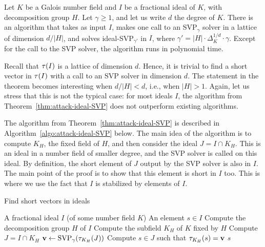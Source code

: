 \begin{theorem}
\label{thm:attack-ideal-SVP}
Let $K$ be a Galois number field and $I$ be a fractional ideal of $K$, with decomposition group $H$. Let $\gamma \geq 1$, and let us write $d$ the degree of $K$. There is an algorithm that takes as input $I$, makes one call to an SVP$_\gamma$ solver in a lattice of dimension $d/|H|$, and solves ideal-SVP$_{\gamma'}$ in $I$, where $\gamma' = |H| \cdot \Delta_K^{1/d} \cdot \gamma$.
Except for the call to the SVP solver, the algorithm runs in polynomial time.
\end{theorem}

Recall that $\tau(I)$ is a lattice of dimension $d$. Hence, it is trivial to find a short vector in $\tau(I)$ with a call to an SVP solver in dimension $d$. The statement in the theorem becomes interesting when $d/|H| < d$, i.e., when $|H| > 1$. Again, let us stress that this is not the typical case: for most ideals $I$, the algorithm from Theorem~\ref{thm:attack-ideal-SVP} does not outperform existing algorithms.

The algorithm from Theorem~\ref{thm:attack-ideal-SVP} is described in Algorithm~\ref{algo:attack-ideal-SVP} below. The main idea of the algorithm is to compute $K_H$, the fixed field of $H$, and then consider the ideal $J = I \cap K_H$. This is an ideal in a number field of smaller degree, and the SVP solver is called on this ideal. By definition, the short element of $J$ output by the SVP solver is also in $I$. The main point of the proof is to show that this element is short in $I$ too. This is where we use the fact that $I$ is stabilized by elements of $I$.

\begin{algorithm}
\caption{Find short vectors in ideals}
\label{algo:attack-ideal-SVP}
\begin{algorithmic}[1]
\REQUIRE A fractional ideal $I$ (of some number field $K$)
\ENSURE An element $s \in I$
\STATE Compute the decomposition group $H$ of $I$
\STATE Compute the subfield $K_H$ of $K$ fixed by $H$
\STATE Compute $J = I \cap K_H$
\STATE $\mathbf v \leftarrow \text{SVP}_\gamma(\tau_{K_H}(J))$ \label{step:SVP}
\STATE Compute $s \in J$ such that $\tau_{K_H}(s) = \mathbf v$
\RETURN $s$
\end{algorithmic}
\end{algorithm} 

